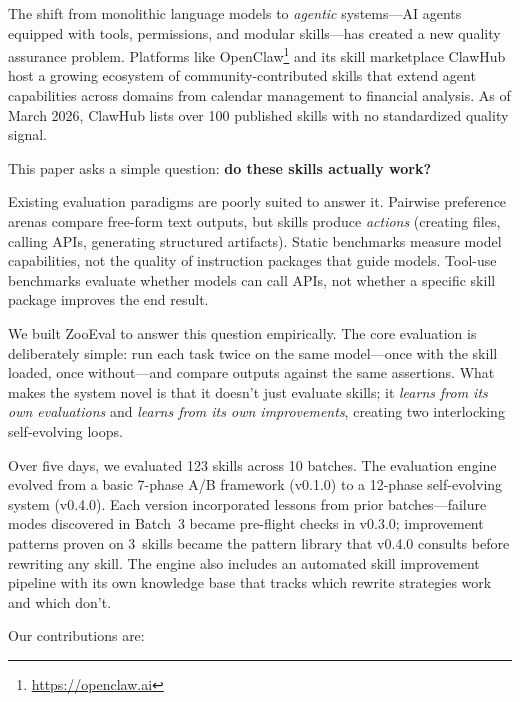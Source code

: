\documentclass[11pt,a4paper]{article}
\begin{document}
The shift from monolithic language models to \emph{agentic} systems---AI agents equipped with tools, permissions, and modular skills---has created a new quality assurance problem. Platforms like OpenClaw\footnote{\url{https://openclaw.ai}} and its skill marketplace ClawHub host a growing ecosystem of community-contributed skills that extend agent capabilities across domains from calendar management to financial analysis. As of March 2026, ClawHub lists over 100 published skills with no standardized quality signal.

This paper asks a simple question: \textbf{do these skills actually work?}

Existing evaluation paradigms are poorly suited to answer it. Pairwise preference arenas \citep{chiang2024chatbot} compare free-form text outputs, but skills produce \emph{actions} (creating files, calling APIs, generating structured artifacts). Static benchmarks \citep{hendrycks2021mmlu, chen2021humaneval} measure model capabilities, not the quality of instruction packages that guide models. Tool-use benchmarks \citep{qin2023toolllm, li2023apibank} evaluate whether models can call APIs, not whether a specific skill package improves the end result.

We built ZooEval to answer this question empirically. The core evaluation is deliberately simple: run each task twice on the same model---once with the skill loaded, once without---and compare outputs against the same assertions. What makes the system novel is that it doesn't just evaluate skills; it \emph{learns from its own evaluations} and \emph{learns from its own improvements}, creating two interlocking self-evolving loops.

Over five days, we evaluated 123 skills across 10 batches. The evaluation engine evolved from a basic 7-phase A/B framework (v0.1.0) to a 12-phase self-evolving system (v0.4.0). Each version incorporated lessons from prior batches---failure modes discovered in Batch~3 became pre-flight checks in v0.3.0; improvement patterns proven on 3~skills became the pattern library that v0.4.0 consults before rewriting any skill. The engine also includes an automated skill improvement pipeline with its own knowledge base that tracks which rewrite strategies work and which don't.

Our contributions are:
\end{document}
